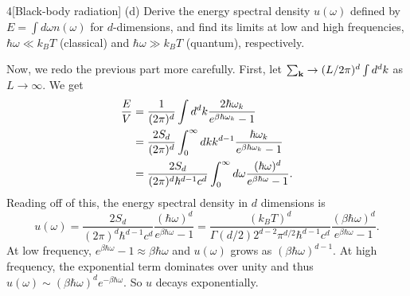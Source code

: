 \documentclass[12pt]{article}
\begin{document}
\begin{problem}{4}[Black-body radiation]
(d) Derive the energy spectral density $u(\omega)$ defined by $E=\int d\omega
n(\omega)$ for $d$-dimensions, and find its limits at low and high frequencies,
$\hbar\omega\ll k_BT$ (classical) and $\hbar\omega\gg k_BT$ (quantum),
respectively.
\begin{solution}
Now, we redo the previous part more carefully. First, let $\sum_{\vb{k}}\to
(L/2\pi)^d\int d^dk$ as $L\to\infty$. We get
\begin{align}\label{p4d:E}
    \frac{E}{V}&=\frac{1}{(2\pi)^d}\int
    d^dk\frac{2\hbar\omega_k}{e^{\beta\hbar\omega_k}-1}\notag\\
     &=\frac{2S_d}{(2\pi)^d}\int_0^\infty dk
     k^{d-1}\frac{\hbar\omega_k}{e^{\beta\hbar\omega_k}-1}\notag\\
     &=\frac{2S_d}{(2\pi)^d\hbar^{d-1}c^d}\int_0^\infty
     d\omega\frac{(\hbar\omega)^{d}}{e^{\beta\hbar\omega}-1}.
\end{align}
Reading off of this, the energy spectral density in $d$ dimensions is
\begin{equation}
    u(\omega)=\frac{2S_d}{(2\pi)^d\hbar^{d-1}c^d}\frac{(\hbar\omega)^d}{e^{\beta\hbar\omega}-1}
    =\frac{(k_BT)^d}{\Gamma(d/2)2^{d-2}\pi^{d/2}\hbar^{d-1}c^d}\frac{(\beta\hbar\omega)^d}{e^{\beta\hbar\omega}-1}.
\end{equation}
At low frequency, $e^{\beta\hbar\omega}-1\approx \beta\hbar\omega$ and
$u(\omega)$ grows as $(\beta\hbar\omega)^{d-1}$. At high frequency, the
exponential term dominates over unity and thus $u(\omega)\sim
(\beta\hbar\omega)^de^{-\beta\hbar\omega}$. So $u$ decays exponentially.
\end{solution}


\end{problem}
\end{document}
